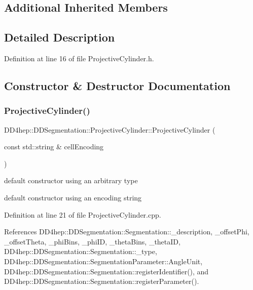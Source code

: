 \subsection*{Additional Inherited Members}


\subsection{Detailed Description}


Definition at line 16 of file Projective\+Cylinder.\+h.



\subsection{Constructor \& Destructor Documentation}
\hypertarget{class_d_d4hep_1_1_d_d_segmentation_1_1_projective_cylinder_ad99ec82db9b7ce8a7433bfa524c3040b}{}\label{class_d_d4hep_1_1_d_d_segmentation_1_1_projective_cylinder_ad99ec82db9b7ce8a7433bfa524c3040b} 
\subsubsection{\texorpdfstring{Projective\+Cylinder()}{ProjectiveCylinder()}\hspace{0.1cm}{\footnotesize\ttfamily [1/2]}}
{\footnotesize\ttfamily D\+D4hep\+::\+D\+D\+Segmentation\+::\+Projective\+Cylinder\+::\+Projective\+Cylinder (\begin{DoxyParamCaption}\item[{const std\+::string \&}]{cell\+Encoding }\end{DoxyParamCaption})}



default constructor using an arbitrary type 

default constructor using an encoding string 

Definition at line 21 of file Projective\+Cylinder.\+cpp.



References D\+D4hep\+::\+D\+D\+Segmentation\+::\+Segmentation\+::\+\_\+description, \+\_\+offset\+Phi, \+\_\+offset\+Theta, \+\_\+phi\+Bins, \+\_\+phi\+ID, \+\_\+theta\+Bins, \+\_\+theta\+ID, D\+D4hep\+::\+D\+D\+Segmentation\+::\+Segmentation\+::\+\_\+type, D\+D4hep\+::\+D\+D\+Segmentation\+::\+Segmentation\+Parameter\+::\+Angle\+Unit, D\+D4hep\+::\+D\+D\+Segmentation\+::\+Segmentation\+::register\+Identifier(), and D\+D4hep\+::\+D\+D\+Segmentation\+::\+Segmentation\+::register\+Parameter().

